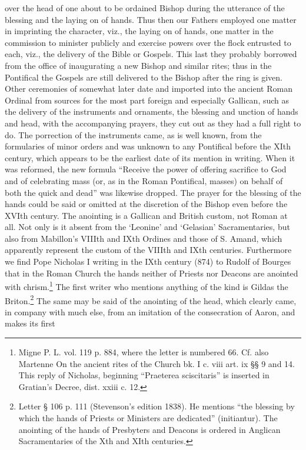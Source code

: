 over the head of one about to be ordained Bishop during the utterance of the blessing and the laying on of hands. Thus then our Fathers employed one matter in imprinting the character, viz., the laying on of hands, one matter in the commission to minister publicly and exercise powers over the flock entrusted to each, viz., the delivery of the Bible or Gospels. This last they probably borrowed from the office of inaugurating a new Bishop and similar rites; thus in the Pontifical the Gospels are still delivered to the Bishop after the ring is given. Other ceremonies of somewhat later date and imported into the ancient Roman Ordinal from sources for the most part foreign and especially Gallican, such as the delivery of the instruments and ornaments, the blessing and unction of hands and head, with the accompanying prayers, they cut out as they had a full right to do. The porrection of the instruments came, as is well known, from the formularies of minor orders and was unknown to any Pontifical before the XIth century, which appears to be the earliest date of its mention in writing. When it was reformed, the new formula “Receive the power of offering sacrifice to God and of celebrating mass (or, as in the Roman Pontifical, masses) on behalf of both the quick and dead” was likewise dropped. The prayer for the blessing of the hands could be said or omitted at the discretion of the Bishop even before the XVIth century. The anointing is a Gallican and British custom, not Roman at all. Not only is it absent from the ‘Leonine’ and ‘Gelasian’ Sacramentaries, but also from Mabillon’s VIIIth and IXth Ordines and those of S. Amand, which apparently represent the custom of the VIIIth and IXth centuries. Furthermore we find Pope Nicholas I writing in the IXth century (874) to Rudolf of Bourges that in the Roman Church the hands neither of Priests nor Deacons are anointed with chrism.\footnote{Migne P. L. vol. 119 p. 884, where the letter is numbered 66. Cf. also Martenne On the ancient rites of the Church bk. I c. viii art. ix §§ 9 and 14. This reply of Nicholas, beginning “Praeterea sciscitaris” is inserted in Gratian’s Decree, dist. xxiii c. 12.} The first writer who mentions anything of the kind is Gildas the Briton.\footnote{Letter § 106 p. 111 (Stevenson’s edition 1838). He mentions “the blessing by which the hands of Priests or Ministers are dedicated” (initiantur). The anointing of the hands of Presbyters and Deacons is ordered in Anglican Sacramentaries of the Xth and XIth centuries.} The same may be said of the anointing of the head, which clearly came, in company with much else, from an imitation of the consecration of Aaron, and makes its first

